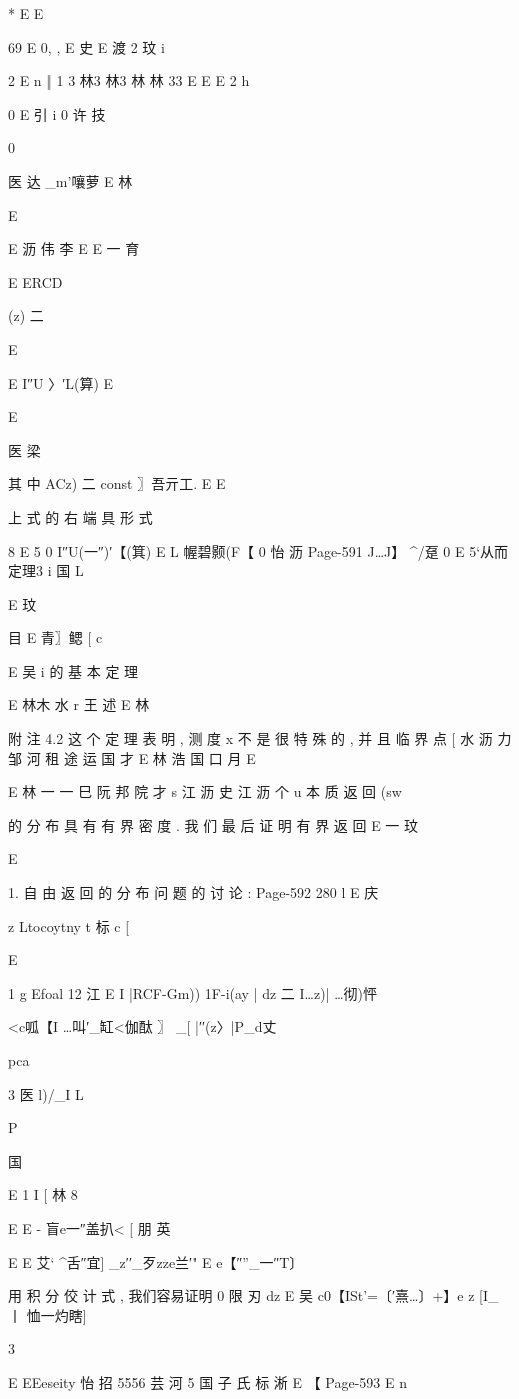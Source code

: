 {{{* E
E

69 E 0,
, E 史
E 渡 2
玟
i

2 E n ‖
1
3 林3 林3 林 林 33
E E E 2 h

0
E 引 i 0 许 技

0

医 达
_m'嚷萝 E 林

E

E 沥 伟 李
E
E 一 育

E
ERCD

(z) 二

E

E I″U 〉′L(算) E

E

医 梁

其 中 ACz) 二 const 〗吾亓工. E
E

上 式 的 右 端 具 形 式

8
E 5 0
I″U(一″)′【(箕) E L 幄碧颢(F【 0 怡 沥
Page-591
J…J】 ^/趸 0
E 5`从而定理3 i 国 L

E
玟

目
E 青〗鳃 [
c

E 吴 i
的 基 本 定 理

E 林木 水
r 王 述
E 林

附 注 4.2 这 个 定 理 表 明 , 测 度 x 不 是 很 特 殊 的 , 并 且 临 界 点
[ 水 沥 力 邹 河 租 途 运
国
才
E 林 浩 国 口 月
E

E 林 一 一
巳 阮 邦 院 才 s 江 沥 史 江
沥 个 u
本 质 返 回 (sw } 的 分 布 具 有 有 界 密 度 . 我 们 最 后 证 明 有 界 返 回 { }
E 一 玟

E

1. 自 由 返 回 的 分 布 问 题 的 讨 论 :
Page-592
280 l
E 庆

z
Ltocoytny t 标 c
[

E

1
g Efoal 12 江 E
I |RCF-Gm)) 1F-i(ay | dz 二 I…z)| …彻)怦

<c呱【I …叫′_缸<伽酞 〗 _[ |′′(z〉|P_d丈

pca

3 医 l)/_I L

P

国

E
1 I [
林 8

E
E
- 盲e一″盖扒< [ 朋 英

E
E 艾` ^舌″宜] _z′′_歹zze兰′" E e【″”_一″T〕

用 积 分 佼 计 式 , 我们容易证明
0 限 刃 dz
E 吴
c0【ISt'=〔′熹…〕+】e z [I_丨 恤一灼瞎]

3

E
EEeseity 怡 招 5556 芸 河 5 国 子 氏 标 淅
E 【
Page-593
E n

}}
